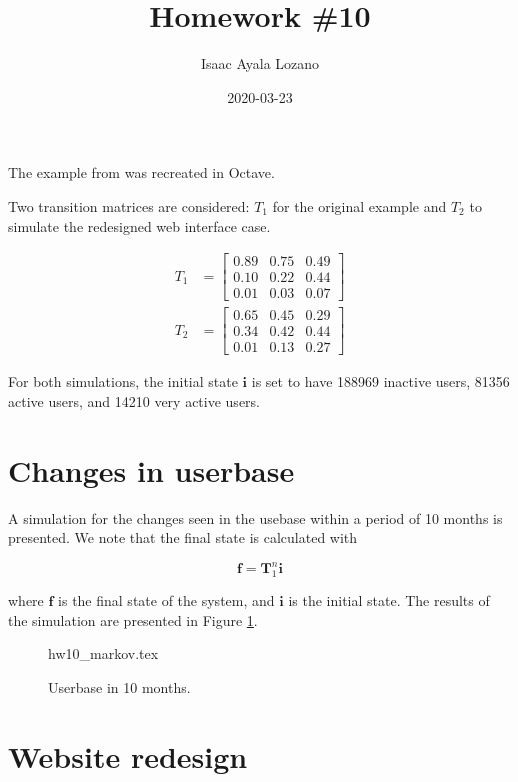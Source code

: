 \documentclass[a4paper,12pt]{article}
\title{Homework \#10}
\author{Isaac Ayala Lozano}
\date{2020-03-23}
\begin{document}
\maketitle

The example from \cite{towardsdatascience2018markov} was recreated in Octave.

Two transition matrices are considered: $T_1$ for the original example and $T_2$ to simulate the redesigned web interface case.

\begin{align}
\label{eq: original matrix}
 T_1 & = \begin{bmatrix}
        0.89 & 0.75 & 0.49 \\
        0.10 & 0.22 & 0.44 \\
        0.01 & 0.03 & 0.07
     \end{bmatrix}\\
     \label{eq: redesign matrix}
 T_2 &= \begin{bmatrix}
        0.65 & 0.45 & 0.29 \\
        0.34 & 0.42 & 0.44 \\
        0.01 & 0.13 & 0.27
     \end{bmatrix}
\end{align}

For both simulations, the initial state $\mathbf{i}$ is set to have
188969 inactive users, 81356 active users, and 14210 very active users.

\section{Changes in userbase}
A simulation for the changes seen in the usebase within a period of 10 months is presented.
We note that the final state is calculated with

\begin{equation*}
 \mathbf{f} = \mathbf{T}_1^n \mathbf{i}
\end{equation*}

where $\mathbf{f}$ is the final state of the system, and $\mathbf{i}$ is the initial state.
The results of the simulation are presented in Figure \ref{fig: markov}.

\begin{figure}[htb!]
\centering
{hw10_markov.tex}
\caption{Userbase in 10 months.}
\label{fig: markov}
\end{figure}

\newpage
\pagebreak

\section{Website redesign}
\end{document}
